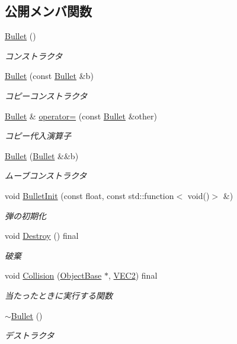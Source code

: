 \subsection*{公開メンバ関数}
\begin{DoxyCompactItemize}
\item 
\mbox{\hyperlink{class_bullet_acd7befc0bc18907cc1d871d37bbdddeb}{Bullet}} ()
\begin{DoxyCompactList}\small\item\em コンストラクタ \end{DoxyCompactList}\item 
\mbox{\hyperlink{class_bullet_a7e1ed7ba89e019b3d0fd068cfb4f9a6d}{Bullet}} (const \mbox{\hyperlink{class_bullet}{Bullet}} \&b)
\begin{DoxyCompactList}\small\item\em コピーコンストラクタ \end{DoxyCompactList}\item 
\mbox{\hyperlink{class_bullet}{Bullet}} \& \mbox{\hyperlink{class_bullet_a2a98443028be8389c0eb9da9a09f661c}{operator=}} (const \mbox{\hyperlink{class_bullet}{Bullet}} \&other)
\begin{DoxyCompactList}\small\item\em コピー代入演算子 \end{DoxyCompactList}\item 
\mbox{\hyperlink{class_bullet_a4bf8f227cde57a6abcdd268df2ef9a9d}{Bullet}} (\mbox{\hyperlink{class_bullet}{Bullet}} \&\&b)
\begin{DoxyCompactList}\small\item\em ムーブコンストラクタ \end{DoxyCompactList}\item 
void \mbox{\hyperlink{class_bullet_ab6b7b4ebc19095372a8e5ef3ad45ff65}{Bullet\+Init}} (const float, const std\+::function$<$ void()$>$ \&)
\begin{DoxyCompactList}\small\item\em 弾の初期化 \end{DoxyCompactList}\item 
void \mbox{\hyperlink{class_bullet_a09a92c6b924fb6bc38e18f6c41ac20ff}{Destroy}} () final
\begin{DoxyCompactList}\small\item\em 破棄 \end{DoxyCompactList}\item 
void \mbox{\hyperlink{class_bullet_a945da4a16d11cfee31139d564bea61f0}{Collision}} (\mbox{\hyperlink{class_object_base}{Object\+Base}} $\ast$, \mbox{\hyperlink{common_8h_afb0c5e21d4133ff4f200992c0b534e1b}{V\+E\+C2}}) final
\begin{DoxyCompactList}\small\item\em 当たったときに実行する関数 \end{DoxyCompactList}\item 
\mbox{\hyperlink{class_bullet_aaeb5cb41d7db89f49007b08b41f1bfcf}{$\sim$\+Bullet}} ()
\begin{DoxyCompactList}\small\item\em デストラクタ \end{DoxyCompactList}\end{DoxyCompactItemize}
